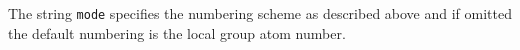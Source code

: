 The string {\tt mode} specifies the numbering scheme as described above and if omitted the
default numbering is the local group atom number.
%
%
%
%
%
%
%
%
